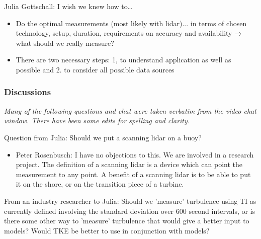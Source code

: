 Julia Gottschall: I wish we knew how to\ldots{}

\begin{itemize}
    \item Do the optimal measurements (most likely with lidar)... in terms of chosen technology, setup, duration, requirements on accuracy and availability → what should we really measure?
    \item There are two necessary steps: 1, to understand application as well as possible and 2. to consider all possible data sources
\end{itemize}

\subsubsection{Discussions}

\emph{Many of the following questions and chat were taken verbatim from the video chat window. There have been some edits for spelling and clarity.}

Question from Julia: Should we put a scanning lidar on a buoy?

\begin{itemize}
\item  Peter Rosenbusch: I have no objections to this. We are involved in a
  research project. The definition of a scanning lidar is a device which
  can point the measurement to any point. A benefit of a scanning lidar
  is to be able to put it on the shore, or on the transition piece of a
  turbine.
\end{itemize}

From an industry researcher to Julia: Should we 'measure' turbulence
using TI as currently defined involving the standard deviation over 600
second intervals, or is there some other way to 'measure' turbulence
that would give a better input to models? Would TKE be better to use in
conjunction with models?

